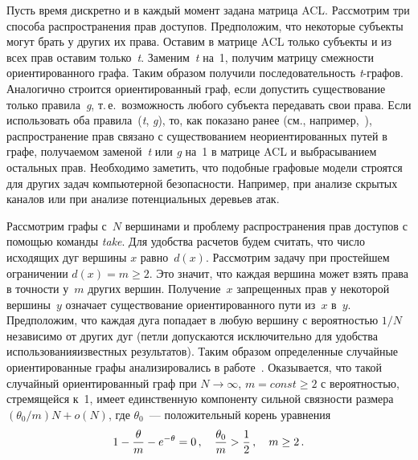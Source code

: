 \begin{multicols}{2}
Пусть время дискретно и в каждый момент задана матрица ACL.
Рассмотрим три способа распространения прав доступов. Предположим,
что некоторые субъекты могут брать у других их права. Оставим в
матрице ACL только субъекты и из всех прав оставим только~\textit{t}.
Заменим~\textit{t} на~1, получим матрицу смежности ориентированного
графа. Таким образом получили последовательность \textit{t}-гра\-фов.
Аналогично строится ориентированный граф, если допустить
существование только правила~\textit{g}, т.\,е.\ возможность любого
субъекта передавать свои права. Если использовать оба правила~(\textit{t}, 
\textit{g}), то, как показано ранее (см., например,~\cite{b2}), 
распространение прав связано с существованием
неориентированных путей в графе, получаемом заменой~\textit{t} или
\textit{g} на~1 в матрице ACL и выбрасыванием остальных прав.
Необходимо заметить, что подобные графовые модели строятся для
других задач компьютерной безопасности. Например, при анализе
скрытых каналов или при анализе потенциальных деревьев атак.

Рассмотрим графы с~$N$ вершинами и проблему распространения прав
доступов с помощью команды \textit{take}. Для удобства расчетов будем
считать, что число исходящих дуг вершины $x$ равно~$d(x)$.
Рассмотрим задачу при простейшем ограничении $d(x)=m\geq 2$. Это
значит, что каждая вершина может взять права в точности у~$m$ других
вершин. Получение~$x$ запрещенных прав у некоторой вершины~$y$
означает существование ориентированного пути из~$x$ в~$y$.
Предположим, что каждая дуга попадает в любую вершину с вероятностью\linebreak
$1/N$ независимо от других дуг (петли допускаются
исключительно для удобства использования\linebreak известных результатов).
Таким образом определенные случайные ориентированные графы
анализировались в работе~\cite{b1}. Оказывается, что такой случайный
ориентированный граф при $N\rightarrow \infty$, $m=const\geq 2$ с
вероятностью, стремящейся к~1, имеет единственную компоненту сильной
связ\-ности размера $(\theta_0/m)N+o(N)$, где $\theta_0$~---
положительный корень уравнения
$$
1-\displaystyle\frac{\displaystyle \theta\mathstrut}{\displaystyle m\mathstrut}-e^{-\theta}=0\,,\quad \displaystyle\frac{\displaystyle \theta_0\mathstrut}{\displaystyle m\mathstrut}> \displaystyle\frac{\displaystyle 1\mathstrut}{\displaystyle 2\mathstrut}\,,\quad
m\geq 2\,.
$$


\end{multicols}
